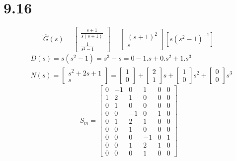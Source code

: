 \documentclass{article}
\begin{document}
\section*{9.16}
\[
\hat{G}(s)=\left[
    \begin{array}{c}
        \frac{s+1}{s(s+1)}\\
        \frac{1}{s^2-1}
    \end{array}
\right]=
\left[
    \begin{array}{c}
    (s+1)^2\\
    s
    \end{array}
\right]
\left[
    s(s^2-1)^{-1}
\right]
\]
\[
\begin{split}
&D(s)=s(s^2-1)=s^3-s=0-1.s+0.s^2+1.s^3\\
&N(s)=
\left[
\begin{array}{c}
s^2+2s+1\\
s
\end{array}
\right]=\left[
    \begin{array}{c}
        1\\
        0
    \end{array}
\right]+
\left[
    \begin{array}{c}
        2\\
        1
    \end{array}
\right]s+
\left[
    \begin{array}{c}
        1\\
        0
    \end{array}
\right]s^2+
\left[
    \begin{array}{c}
        0\\
        0
    \end{array}
\right]s^3
\end{split}
\]
\[
S_m=
    \left[ 
        \begin{array}{cccccc}
            0 & -1 & 0 & 1 & 0 & 0\\
            1 & 2 & 1 & 0 & 0& 0\\
            0 & 1 & 0 & 0 & 0 & 0\\
            0 & 0 & -1 & 0 & 1 & 0\\
            0 & 1 &2 & 1 & 0 & 0\\
            0 & 0 & 1 & 0 & 0 & 0\\
            0 & 0 & 0 & -1 & 0 & 1\\
            0 & 0 & 1 & 2& 1 & 0 \\
            0 & 0 & 0 & 1 & 0 & 0
        \end{array}
    \right]    
\]
\end{document}
